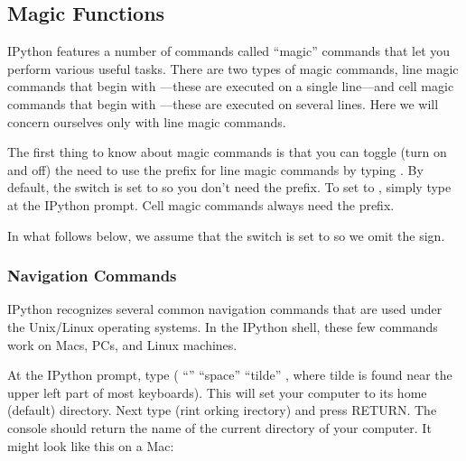 \documentclass[letterpaper,10pt,english]{sphinxmanual}
\begin{document}
\subsection{Magic Functions}
\label{\detokenize{chap2/chap2_basics:magic-functions}}
\ignorespaces 
\sphinxAtStartPar
IPython features a number of commands called “magic” commands that let you perform various useful tasks.  There are two types of magic commands, line magic commands that begin with \sphinxcode{\sphinxupquote{\%}}—these are executed on a single line—and cell magic commands that begin with \sphinxcode{\sphinxupquote{\%\%}}—these are executed on several lines.  Here we will concern ourselves only with line magic commands.

\sphinxAtStartPar
The first thing to know about magic commands is that you can toggle (turn on and off) the need to use the \sphinxcode{\sphinxupquote{\%}} prefix for line magic commands by typing .  By default, the  switch is set to  so you don’t need the \sphinxcode{\sphinxupquote{\%}} prefix.  To set  to , simply type  at the IPython prompt.  Cell magic commands always need the \sphinxcode{\sphinxupquote{\%\%}} prefix.

\sphinxAtStartPar
In what follows below, we assume that the  switch is set to  so we omit the \sphinxcode{\sphinxupquote{\%}} sign.

\ignorespaces 

\subsubsection{Navigation Commands}
\label{\detokenize{chap2/chap2_basics:navigation-commands}}\label{\detokenize{chap2/chap2_basics:index-5}}
\sphinxAtStartPar
IPython recognizes several common navigation commands that are used under the Unix/Linux operating systems.  In the IPython shell, these few commands work on Macs, PCs, and Linux machines.

\sphinxAtStartPar
At the IPython prompt, type  ( “” \textendash{} “space” \textendash{} “tilde” , where tilde is found near the upper left part of most keyboards).  This will set your computer to its home (default) directory.  Next type  (rint orking irectory) and press RETURN.  The console should return the name of the current directory of your computer.  It might look like this on a Mac:
\end{document}
